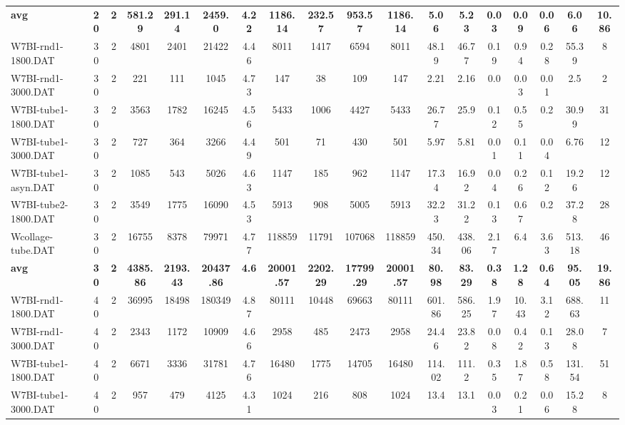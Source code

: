 \begin{sidewaystable}[h]
{\begin{tabular}{lccccccccccccccccc}
\cline{1-18} \textbf{avg} & \textbf{20} & \textbf{2} & \textbf{581.29} & \textbf{291.14} & \textbf{2459.0} & \textbf{4.22} & \textbf{1186.14} & \textbf{232.57} & \textbf{953.57} & \textbf{1186.14} & \textbf{5.06} & \textbf{5.23} & \textbf{0.03} & \textbf{0.09} & \textbf{0.06} & \textbf{6.06} & \textbf{10.86} \\ \cline{1-18}
W7BI-rnd1-1800.DAT & 30 & 2 & 4801 & 2401 & 21422 & 4.46 & 8011 & 1417 & 6594 & 8011 & 48.19 & 46.77 & 0.19 & 0.94 & 0.28 & 55.39 & 8\\
W7BI-rnd1-3000.DAT & 30 & 2 & 221 & 111 & 1045 & 4.73 & 147 & 38 & 109 & 147 & 2.21 & 2.16 & 0.0 & 0.03 & 0.01 & 2.5 & 2\\
W7BI-tube1-1800.DAT & 30 & 2 & 3563 & 1782 & 16245 & 4.56 & 5433 & 1006 & 4427 & 5433 & 26.77 & 25.9 & 0.12 & 0.55 & 0.2 & 30.99 & 31\\
W7BI-tube1-3000.DAT & 30 & 2 & 727 & 364 & 3266 & 4.49 & 501 & 71 & 430 & 501 & 5.97 & 5.81 & 0.01 & 0.11 & 0.04 & 6.76 & 12\\
W7BI-tube1-asyn.DAT & 30 & 2 & 1085 & 543 & 5026 & 4.63 & 1147 & 185 & 962 & 1147 & 17.34 & 16.92 & 0.04 & 0.26 & 0.12 & 19.26 & 12\\
W7BI-tube2-1800.DAT & 30 & 2 & 3549 & 1775 & 16090 & 4.53 & 5913 & 908 & 5005 & 5913 & 32.23 & 31.22 & 0.13 & 0.67 & 0.2 & 37.28 & 28\\
Wcollage-tube.DAT & 30 & 2 & 16755 & 8378 & 79971 & 4.77 & 118859 & 11791 & 107068 & 118859 & 450.34 & 438.06 & 2.17 & 6.4 & 3.63 & 513.18 & 46\\
\cline{1-18} \textbf{avg} & \textbf{30} & \textbf{2} & \textbf{4385.86} & \textbf{2193.43} & \textbf{20437.86} & \textbf{4.6} & \textbf{20001.57} & \textbf{2202.29} & \textbf{17799.29} & \textbf{20001.57} & \textbf{80.98} & \textbf{83.29} & \textbf{0.38} & \textbf{1.28} & \textbf{0.64} & \textbf{95.05} & \textbf{19.86} \\ \cline{1-18}
W7BI-rnd1-1800.DAT & 40 & 2 & 36995 & 18498 & 180349 & 4.87 & 80111 & 10448 & 69663 & 80111 & 601.86 & 586.25 & 1.97 & 10.43 & 3.12 & 688.63 & 11\\
W7BI-rnd1-3000.DAT & 40 & 2 & 2343 & 1172 & 10909 & 4.66 & 2958 & 485 & 2473 & 2958 & 24.46 & 23.82 & 0.08 & 0.42 & 0.13 & 28.08 & 7\\
W7BI-tube1-1800.DAT & 40 & 2 & 6671 & 3336 & 31781 & 4.76 & 16480 & 1775 & 14705 & 16480 & 114.02 & 111.2 & 0.35 & 1.87 & 0.58 & 131.54 & 51\\
W7BI-tube1-3000.DAT & 40 & 2 & 957 & 479 & 4125 & 4.31 & 1024 & 216 & 808 & 1024 & 13.4 & 13.1 & 0.03 & 0.21 & 0.06 & 15.28 & 8\\

\end{tabular}}
\end{sidewaystable}
